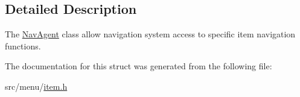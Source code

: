 \subsection{Detailed Description}
The \hyperlink{structNavAgent}{Nav\+Agent} class allow navigation system access to specific item navigation functions. 

The documentation for this struct was generated from the following file\+:\begin{DoxyCompactItemize}
\item 
src/menu/\hyperlink{item_8h}{item.\+h}\end{DoxyCompactItemize}
